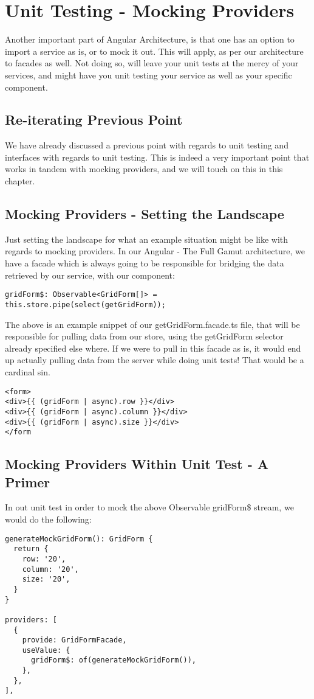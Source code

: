 \maketitle{}
\section{ Unit Testing - Mocking Providers }
Another important part of Angular Architecture, is that one has an option to
import a service as is, or to mock it out. This will apply, as per our
architecture to facades as well. Not doing so, will leave your unit tests at
the mercy of your services, and might have you unit testing your service as
well as your specific component.

\subsection{ Re-iterating Previous Point }
We have already discussed a previous point with regards to unit testing and
interfaces with regards to unit testing. This is indeed a very important point
that works in tandem with mocking providers, and we will touch on this in this
chapter.

\subsection{ Mocking Providers - Setting the Landscape }
Just setting the landscape for what an example situation might be like with
regards to mocking providers. In our Angular - The Full Gamut architecture, we
have a facade which is always going to be responsible for bridging the data
retrieved by our service, with our component:
\begin{lstlisting}
gridForm$: Observable<GridForm[]> = this.store.pipe(select(getGridForm));
\end{lstlisting}

The above is an example snippet of our getGridForm.facade.ts file, that will
be responsible for pulling data from our store, using the getGridForm selector
already specified else where. If we were to pull in this facade as is, it would
end up actually pulling data from the server while doing unit tests! That would
be a cardinal sin.
\begin{verbatim}
<form>
<div>{{ (gridForm | async).row }}</div>
<div>{{ (gridForm | async).column }}</div>
<div>{{ (gridForm | async).size }}</div>
</form
\end{verbatim}

\subsection{ Mocking Providers Within Unit Test - A Primer }
In out unit test in order to mock the above Observable gridForm\$ stream, we
would do the following:
\begin{lstlisting}
generateMockGridForm(): GridForm {
  return {
    row: '20',
    column: '20',
    size: '20',
  }
}

providers: [
  {
    provide: GridFormFacade,
    useValue: {
      gridForm$: of(generateMockGridForm()),
    },
  },
],
\end{lstlisting}

